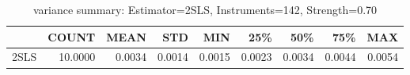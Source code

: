 \begin{table}[ht]
\centering
\caption{variance summary: Estimator=2SLS, Instruments=142, Strength=0.70}
\begin{tabular}{lrrrrrrrr}
\toprule
 & COUNT & MEAN & STD & MIN & 25\% & 50\% & 75\% & MAX \\
\midrule
2SLS & 10.0000 & 0.0034 & 0.0014 & 0.0015 & 0.0023 & 0.0034 & 0.0044 & 0.0054 \\
\bottomrule
\end{tabular}
\end{table}
